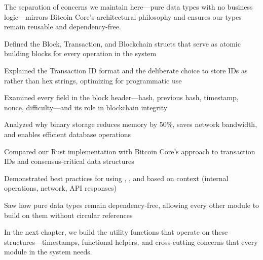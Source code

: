 The separation of concerns we maintain here---pure data types with no business logic---mirrors Bitcoin Core's architectural philosophy and ensures our types remain reusable and dependency-free.

\begin{chaptersummary}

\item Defined the Block, Transaction, and Blockchain structs that serve as atomic building blocks for every operation in the system

\item Explained the Transaction ID format and the deliberate choice to store IDs as  rather than hex strings, optimizing for programmatic use

\item Examined every field in the block header---hash, previous hash, timestamp, nonce, difficulty---and its role in blockchain integrity

\item Analyzed why binary storage reduces memory by 50\%, saves network bandwidth, and enables efficient database operations

\item Compared our Rust implementation with Bitcoin Core's approach to transaction IDs and consensus-critical data structures

\item Demonstrated best practices for using , , and  based on context (internal operations, network, API responses)

\item Saw how pure data types remain dependency-free, allowing every other module to build on them without circular references

\end{chaptersummary}

In the next chapter, we build the utility functions that operate on these structures---timestamps, functional helpers, and cross-cutting concerns that every module in the system needs.

